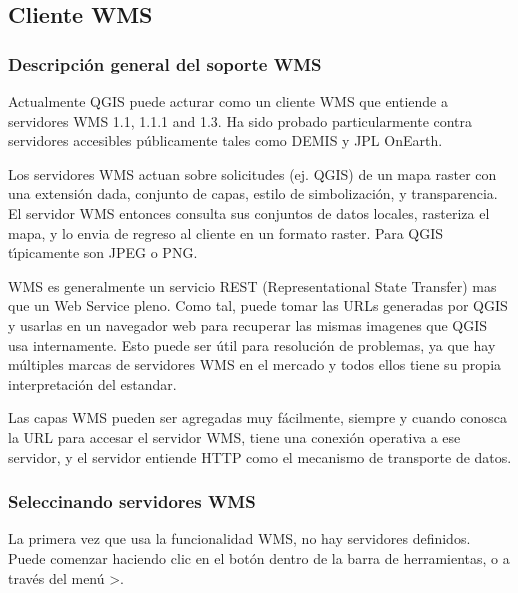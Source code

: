 \subsection{Cliente WMS}\label{sec:ogc-wms}

\subsubsection{Descripci\'on general del soporte WMS}\label{sec:ogc-wms-about}

Actualmente QGIS puede acturar como un cliente WMS que entiende a servidores WMS 1.1, 1.1.1 and 1.3.
Ha sido probado particularmente contra servidores accesibles p\'ublicamente 
tales como DEMIS y JPL OnEarth.

Los servidores WMS actuan sobre solicitudes (ej. QGIS) de un mapa raster con
una extensi\'on dada, conjunto de capas, estilo de simbolizaci\'on, y transparencia.  El servidor WMS
entonces consulta sus conjuntos de datos locales, rasteriza el mapa, y lo envia
de regreso al cliente en un formato raster.  Para QGIS t\'{\i}picamente son
JPEG o PNG.

WMS es generalmente un servicio REST (Representational State Transfer) mas  que un
Web Service pleno.  Como tal, puede tomar las URLs generadas por
QGIS y usarlas en un navegador web para recuperar las mismas imagenes que QGIS usa
internamente.  Esto puede ser \'util para resoluci\'on de problemas, ya que hay
m\'ultiples marcas de servidores WMS en el mercado y todos ellos tiene su
propia interpretaci\'on del estandar.

Las capas WMS pueden ser agregadas muy f\'acilmente, siempre y cuando conosca la URL para
accesar el servidor WMS, tiene una conexi\'on operativa a ese servidor, y el servidor
entiende HTTP como el mecanismo de transporte de datos.

\subsubsection{Seleccinando servidores WMS}\label{sec:ogc-wms-servers}

La primera vez que usa la funcionalidad WMS, no hay servidores definidos. Puede 
comenzar haciendo clic en el bot\'on  dentro de la barra de herramientas, 
o a trav\'es del men\'u >.

